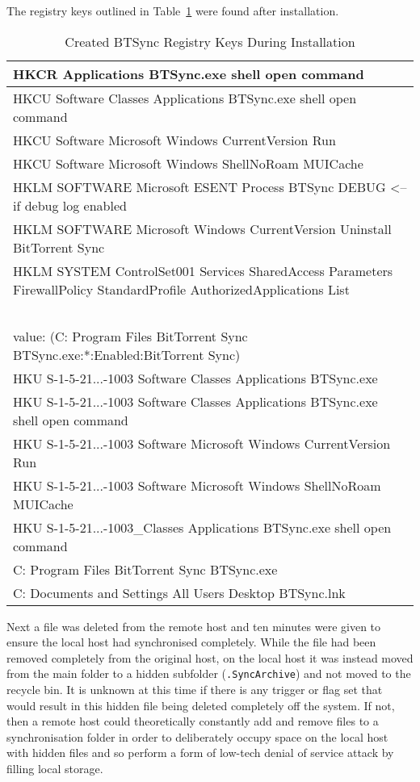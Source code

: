 \documentclass[final,5p,times,twocolumn]{elsarticle}
\begin{document}
 The registry keys outlined in Table~\ref{tab:regkeys} were found after installation.
\begin{table}[h]
\begin{tabular}{|>{\raggedright\arraybackslash}p{8.5cm}|}

\hline
    HKCR Applications  BTSync.exe shell open command                         \\ \hline
    HKCU Software Classes Applications BTSync.exe shell open command \\ \hline
    HKCU Software Microsoft Windows CurrentVersion Run                      \\ \hline
    HKCU Software Microsoft Windows ShellNoRoam MUICache                    \\ \hline
    HKLM SOFTWARE Microsoft ESENT Process BTSync DEBUG <--if debug log enabled \\ \hline
    HKLM SOFTWARE Microsoft Windows CurrentVersion Uninstall BitTorrent Sync \\ \hline
    HKLM SYSTEM ControlSet001 Services SharedAccess Parameters FirewallPolicy StandardProfile AuthorizedApplications List \\ ~ \\value: (C: Program Files BitTorrent Sync BTSync.exe:*:Enabled:BitTorrent Sync)                           \\ \hline
    HKU S-1-5-21...-1003 Software Classes Applications BTSync.exe \\ \hline
    HKU S-1-5-21...-1003 Software Classes Applications BTSync.exe shell open command \\ \hline
    HKU S-1-5-21...-1003 Software Microsoft Windows CurrentVersion Run \\ \hline
    HKU S-1-5-21...-1003 Software Microsoft Windows ShellNoRoam MUICache \\ \hline
    HKU S-1-5-21...-1003\_Classes Applications BTSync.exe shell open command \\ \hline
    C: Program Files BitTorrent Sync BTSync.exe                                                              \\ \hline
    C: Documents and Settings All Users Desktop BTSync.lnk                                          \\ \hline
    \end{tabular}
    \caption {Created BTSync Registry Keys During Installation}
\label{tab:regkeys}
\end{table}

Next a file was deleted from the remote host and ten minutes were given to ensure the local host had synchronised completely. While the file had been removed completely from the original host, on the local host it was instead moved from the main folder to a hidden subfolder (\texttt{.SyncArchive}) and not moved to the recycle bin. It is unknown at this time if there is any trigger or flag set that would result in this hidden file being deleted completely off the system. If not, then a remote host could theoretically constantly add and remove files to a synchronisation folder in order to deliberately occupy space on the local host with hidden files and so perform a form of low-tech denial of service attack by filling local storage.
\end{document}

